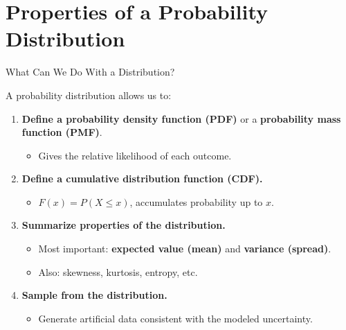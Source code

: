\documentclass{beamer}
\begin{document}


\section{Properties of a Probability Distribution}

\begin{frame}{What Can We Do With a Distribution?}

A probability distribution allows us to:

\vspace{1em}
\begin{enumerate}
  \item \textbf{Define a probability density function (PDF)} or a \textbf{probability mass function (PMF)}.
  \begin{itemize}
    \item Gives the relative likelihood of each outcome.
  \end{itemize}

  \item \textbf{Define a cumulative distribution function (CDF).}
  \begin{itemize}
    \item $F(x) = P(X \leq x)$, accumulates probability up to $x$.
  \end{itemize}

  \item \textbf{Summarize properties of the distribution.}
  \begin{itemize}
    \item Most important: \textbf{expected value (mean)} and \textbf{variance (spread)}.
    \item Also: skewness, kurtosis, entropy, etc.
  \end{itemize}

  \item \textbf{Sample from the distribution.}
  \begin{itemize}
    \item Generate artificial data consistent with the modeled uncertainty.
  \end{itemize}
\end{enumerate}

\end{frame}
\end{document}
